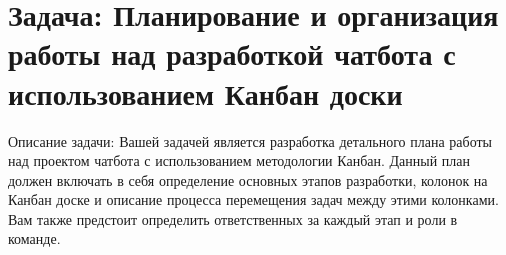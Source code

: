\documentclass[letterpaper,10pt,russian]{sphinxmanual}
\begin{document}
\sphinxstepscope


\section{Задача: Планирование и организация работы над разработкой чат\sphinxhyphen{}бота с использованием Канбан доски}
\label{\detokenize{educational_materials/team_work_on_a_project/exercises:id1}}\label{\detokenize{educational_materials/team_work_on_a_project/exercises::doc}}
\sphinxAtStartPar
Описание задачи: Вашей задачей является разработка детального плана работы над проектом чат\sphinxhyphen{}бота с использованием методологии Канбан. Данный план должен включать в себя определение основных этапов разработки, колонок на Канбан доске и описание процесса перемещения задач между этими колонками. Вам также предстоит определить ответственных за каждый этап и роли в команде.
\end{document}
